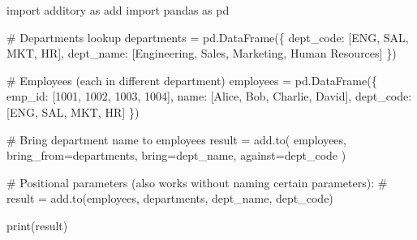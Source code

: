 \documentclass[
  letterpaper,
]{scrbook}
\newenvironment{Shaded}{\begin{snugshade}}{\end{snugshade}}
\newcommand{\BuiltInTok}[1]{\textcolor[rgb]{0.00,0.23,0.31}{#1}}
\newcommand{\CommentTok}[1]{\textcolor[rgb]{0.37,0.37,0.37}{#1}}
\newcommand{\DecValTok}[1]{\textcolor[rgb]{0.68,0.00,0.00}{#1}}
\newcommand{\ImportTok}[1]{\textcolor[rgb]{0.00,0.46,0.62}{#1}}
\newcommand{\NormalTok}[1]{\textcolor[rgb]{0.00,0.23,0.31}{#1}}
\newcommand{\OperatorTok}[1]{\textcolor[rgb]{0.37,0.37,0.37}{#1}}
\newcommand{\StringTok}[1]{\textcolor[rgb]{0.13,0.47,0.30}{#1}}
\begin{document}
\begin{Shaded}
\begin{Highlighting}[]
\ImportTok{import}\NormalTok{ additory }\ImportTok{as}\NormalTok{ add}
\ImportTok{import}\NormalTok{ pandas }\ImportTok{as}\NormalTok{ pd}

\CommentTok{\# Departments lookup}
\NormalTok{departments }\OperatorTok{=}\NormalTok{ pd.DataFrame(\{}
    \StringTok{\textquotesingle{}dept\_code\textquotesingle{}}\NormalTok{: [}\StringTok{\textquotesingle{}ENG\textquotesingle{}}\NormalTok{, }\StringTok{\textquotesingle{}SAL\textquotesingle{}}\NormalTok{, }\StringTok{\textquotesingle{}MKT\textquotesingle{}}\NormalTok{, }\StringTok{\textquotesingle{}HR\textquotesingle{}}\NormalTok{],}
    \StringTok{\textquotesingle{}dept\_name\textquotesingle{}}\NormalTok{: [}\StringTok{\textquotesingle{}Engineering\textquotesingle{}}\NormalTok{, }\StringTok{\textquotesingle{}Sales\textquotesingle{}}\NormalTok{, }\StringTok{\textquotesingle{}Marketing\textquotesingle{}}\NormalTok{, }\StringTok{\textquotesingle{}Human Resources\textquotesingle{}}\NormalTok{]}
\NormalTok{\})}

\CommentTok{\# Employees (each in different department)}
\NormalTok{employees }\OperatorTok{=}\NormalTok{ pd.DataFrame(\{}
    \StringTok{\textquotesingle{}emp\_id\textquotesingle{}}\NormalTok{: [}\DecValTok{1001}\NormalTok{, }\DecValTok{1002}\NormalTok{, }\DecValTok{1003}\NormalTok{, }\DecValTok{1004}\NormalTok{],}
    \StringTok{\textquotesingle{}name\textquotesingle{}}\NormalTok{: [}\StringTok{\textquotesingle{}Alice\textquotesingle{}}\NormalTok{, }\StringTok{\textquotesingle{}Bob\textquotesingle{}}\NormalTok{, }\StringTok{\textquotesingle{}Charlie\textquotesingle{}}\NormalTok{, }\StringTok{\textquotesingle{}David\textquotesingle{}}\NormalTok{],}
    \StringTok{\textquotesingle{}dept\_code\textquotesingle{}}\NormalTok{: [}\StringTok{\textquotesingle{}ENG\textquotesingle{}}\NormalTok{, }\StringTok{\textquotesingle{}SAL\textquotesingle{}}\NormalTok{, }\StringTok{\textquotesingle{}MKT\textquotesingle{}}\NormalTok{, }\StringTok{\textquotesingle{}HR\textquotesingle{}}\NormalTok{]}
\NormalTok{\})}

\CommentTok{\# Bring department name to employees}
\NormalTok{result }\OperatorTok{=}\NormalTok{ add.to(}
\NormalTok{    employees,}
\NormalTok{    bring\_from}\OperatorTok{=}\NormalTok{departments,}
\NormalTok{    bring}\OperatorTok{=}\StringTok{\textquotesingle{}dept\_name\textquotesingle{}}\NormalTok{,}
\NormalTok{    against}\OperatorTok{=}\StringTok{\textquotesingle{}dept\_code\textquotesingle{}}
\NormalTok{)}

\CommentTok{\# Positional parameters (also works without naming certain parameters):}
\CommentTok{\# result = add.to(employees, departments, \textquotesingle{}dept\_name\textquotesingle{}, \textquotesingle{}dept\_code\textquotesingle{})}

\BuiltInTok{print}\NormalTok{(result)}
\end{Highlighting}
\end{Shaded}
\end{document}
